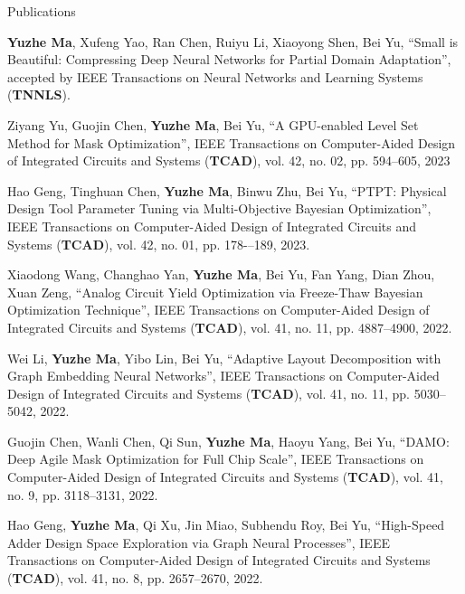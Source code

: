 \begin{rSection}{Publications}
\begin{etaremune}
\item {
    \textbf{Yuzhe Ma}, Xufeng Yao, Ran Chen, Ruiyu Li, Xiaoyong Shen, Bei Yu, 
    ``Small is Beautiful: Compressing Deep Neural Networks for Partial Domain Adaptation'',
    accepted by IEEE Transactions on Neural Networks and Learning Systems (\textbf{TNNLS}).
}

\item {
    Ziyang Yu, Guojin Chen, \textbf{Yuzhe Ma}, Bei Yu, 
    ``A GPU-enabled Level Set Method for Mask Optimization'',
    IEEE Transactions on Computer-Aided Design of Integrated Circuits and Systems (\textbf{TCAD}), vol. 42, no. 02, pp. 594--605, 2023
}

\item {
    Hao Geng, Tinghuan Chen, \textbf{Yuzhe Ma}, Binwu Zhu, Bei Yu, 
    ``PTPT: Physical Design Tool Parameter Tuning via Multi-Objective Bayesian Optimization'',
    IEEE Transactions on Computer-Aided Design of Integrated Circuits and Systems (\textbf{TCAD}), vol. 42, no. 01, pp. 178-–189, 2023.
}

\item {
    Xiaodong Wang, Changhao Yan, \textbf{Yuzhe Ma}, Bei Yu, Fan Yang, Dian Zhou, Xuan Zeng, 
    ``Analog Circuit Yield Optimization via Freeze-Thaw Bayesian Optimization Technique'',
    IEEE Transactions on Computer-Aided Design of Integrated Circuits and Systems (\textbf{TCAD}), vol. 41, no. 11, pp. 4887--4900, 2022.
}

\item {
    Wei Li, \textbf{Yuzhe Ma}, Yibo Lin, Bei Yu,
    ``Adaptive Layout Decomposition with Graph Embedding Neural Networks'',
    IEEE Transactions on Computer-Aided Design of Integrated Circuits and Systems (\textbf{TCAD}), vol. 41, no. 11, pp. 5030--5042, 2022.
}

\item {
    Guojin Chen, Wanli Chen, Qi Sun, \textbf{Yuzhe Ma}, Haoyu Yang, Bei Yu,
    ``DAMO: Deep Agile Mask Optimization for Full Chip Scale'',
    IEEE Transactions on Computer-Aided Design of Integrated Circuits and Systems (\textbf{TCAD}), vol. 41, no. 9, pp. 3118--3131, 2022. 
}


\item {
    Hao Geng, \textbf{Yuzhe Ma}, Qi Xu, Jin Miao, Subhendu Roy, Bei Yu,
    ``High-Speed Adder Design Space Exploration via Graph Neural Processes'',
    IEEE Transactions on Computer-Aided Design of Integrated Circuits and Systems (\textbf{TCAD}), vol. 41, no. 8, pp. 2657--2670, 2022.
}



\end{etaremune}
\end{rSection}
